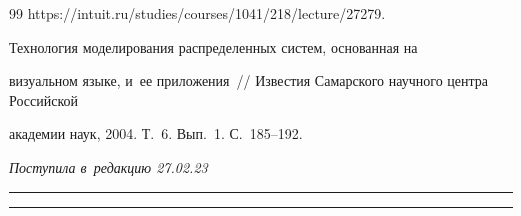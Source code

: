 {{\begin{thebibliography}{99}
{https://intuit.ru/studies/courses/1041/218/\linebreak lecture/27279}.


 Технология моделирования распределенных систем, основанная на 

визуальном языке, и~ее приложения~/\!\!/ Известия Самарского научного центра Российской 

академии наук, 2004. Т.~6. Вып.~1. С.~185--192.

 \end{thebibliography}

} }







\vspace*{-6pt}



\hfill{\small\textit{Поступила в~редакцию 27.02.23}}



\vspace*{8pt}



\hrule



\vspace*{2pt}









\hrule



\vspace*{6pt}



\def\tit{A VISUAL LANGUAGE OF~THE~REPRESENTATION OF~THE~CONFLICT 

MANAGEMENT PROCESS\\ IN~HYBRID INTELLIGENT MULTIAGENT SYSTEMS}







\def\titkol{A visual language of~the~representation of~the~conflict 

management process in~HyIMAS} %



\def\aut{S.\,B.~Rumovskaya and I.\,A.~Kirikov}



